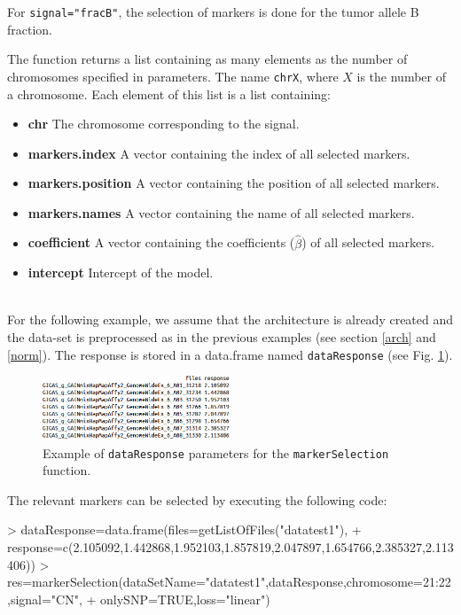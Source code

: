 \documentclass[a4paper,10pt]{article}
\begin{document}
		For \texttt{signal="fracB"}, the selection of markers is done for the tumor allele B fraction.
	 
		The function returns a list containing as many elements as the number of chromosomes specified in parameters. The name \texttt{chrX}, where $X$ is the number of a chromosome. Each element of this list is a list containing:
	
		\begin{itemize}
			\item \textbf{chr} The chromosome corresponding to the signal.
			\item \textbf{markers.index} A vector containing the index of all selected markers.
			\item \textbf{markers.position} A vector containing the position of all selected markers.
			\item \textbf{markers.names} A vector containing the name of all selected markers.
			\item \textbf{coefficient} A vector containing the coefficients ($\hat{\beta}$) of all selected markers.
			\item \textbf{intercept} Intercept of the model.

		\end{itemize}
		~~\\
	
		For the following example, we assume that the architecture is already created and the data-set is preprocessed as in the previous examples (see section \ref{arch} and \ref{norm}). The response is stored in a data.frame named \texttt{dataResponse} (see Fig. \ref{dataresponse}). 
		
		\begin{figure}[!h]
			\centering
			\includegraphics[width=0.5\textwidth]{fig/dataResponse}
			\caption{Example of \texttt{dataResponse} parameters for the \texttt{markerSelection} function.}
			\label{dataresponse}
		\end{figure}
		
The relevant markers can be selected by executing the following code:			
	
\begin{Schunk}
\begin{Sinput}
> dataResponse=data.frame(files=getListOfFiles("datatest1"),
+ response=c(2.105092,1.442868,1.952103,1.857819,2.047897,1.654766,2.385327,2.113406))
> res=markerSelection(dataSetName="datatest1",dataResponse,chromosome=21:22,signal="CN",
+ onlySNP=TRUE,loss="linear")
\end{Sinput}
\end{Schunk}
	
\end{document}
